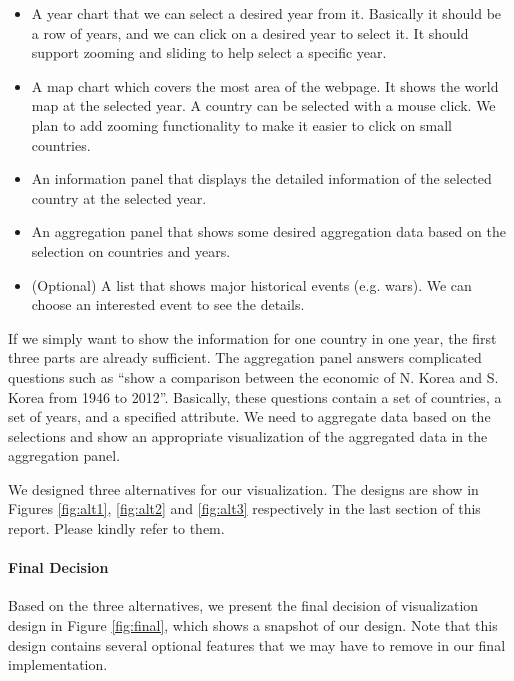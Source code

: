 \documentclass[12pt, fullpage,letterpaper]{article}
\begin{document}
\begin{itemize}
    \item A year chart that we can select a desired year from it.
        Basically it should be a row of years, and we can click on a desired year to select it.
        It should support zooming and sliding to help select a specific year.
    \item A map chart which covers the most area of the webpage.
        It shows the world map at the selected year.
        A country can be selected with a mouse click.
        We plan to add zooming functionality to make it easier to click on small countries.
    \item An information panel that displays the detailed information of the selected country at the selected year.
    \item An aggregation panel that shows some desired aggregation data based on the selection on countries and years.
    \item (Optional) A list that shows major historical events (e.g. wars). We can choose an interested event to see the details.
\end{itemize}

If we simply want to show the information for one country in one year, the
first three parts are already sufficient. The aggregation panel answers
complicated questions such
as ``show a comparison between the economic of N. Korea and S. Korea from 1946
to 2012''.  Basically, these questions contain a set of countries, a set of
years, and a specified attribute.  We need to aggregate data based on the
selections and show an appropriate visualization of the aggregated data in the
aggregation panel.

We designed three alternatives for our visualization.  The designs are show in
Figures \ref{fig:alt1}, \ref{fig:alt2} and \ref{fig:alt3} respectively in the
last section of this report.  Please kindly refer to them.

\paragraph{Final Decision}

Based on the three alternatives, we present the final decision of visualization
design in Figure \ref{fig:final}, which shows a snapshot of our design. Note that
this design contains several optional features that we may have to remove in our
final implementation.
\end{document}

